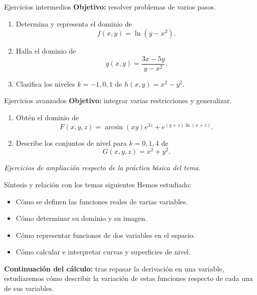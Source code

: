 \documentclass[main.tex]{subfiles}
\begin{document}
\begin{frame}{Ejercicios intermedios}
\textbf{Objetivo:} resolver problemas de varios pasos.
\medskip
\begin{enumerate}
  \item Determina y representa el dominio de
  \[
  f(x,y)=\ln(y-x^2).
  \]
  \item Halla el dominio de
  \[
  g(x,y)=\frac{3x-5y}{y-x^2}.
  \]
  \item Clasifica los niveles $k=-1,0,1$ de $h(x,y)=x^2-y^2$.
\end{enumerate}
\end{frame}

\begin{frame}{Ejercicios avanzados}
\textbf{Objetivo:} integrar varias restricciones y generalizar.
\medskip
\begin{enumerate}
  \item Obtén el dominio de
  \[
  F(x,y,z)=\arcsin(xy)e^{3z}+e^{(y+z)\ln(x+z)}.
  \]
  \item Describe los conjuntos de nivel para $k=0,1,4$ de
  \[
  G(x,y,z)=x^2+y^2.
  \]
\end{enumerate}
\medskip

\textit{Ejercicios de ampliación respecto de la práctica básica del tema.}
\end{frame}

\begin{frame}{Síntesis y relación con los temas siguientes}
Hemos estudiado:
\begin{itemize}
  \item Cómo se definen las funciones reales de varias variables.
  \item Cómo determinar su dominio y su imagen.
  \item Cómo representar funciones de dos variables en el espacio.
  \item Cómo calcular e interpretar curvas y superficies de nivel.
\end{itemize}
\medskip

\textbf{Continuación del cálculo:} tras repasar la derivación en una variable, estudiaremos cómo describir la variación de estas funciones respecto de cada una de sus variables.
\end{frame}
\end{document}

